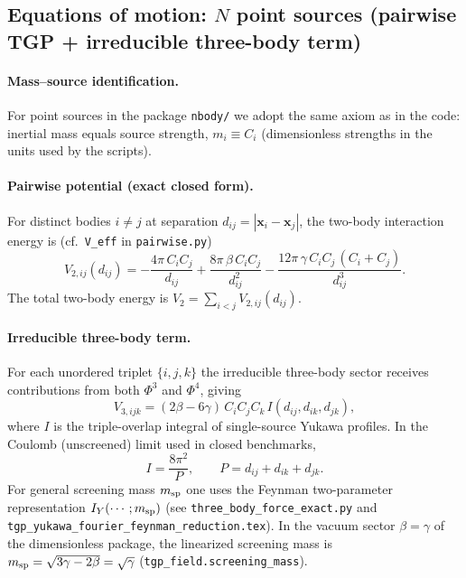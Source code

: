 
\subsection{Equations of motion: $N$ point sources (pairwise TGP + irreducible three-body term)}
\label{subsec:tgp-nbody-lagrangian-eom}

\paragraph{Mass--source identification.}
For point sources in the package \texttt{nbody/} we adopt the same axiom as in the code:
inertial mass equals source strength, $m_i \equiv C_i$ (dimensionless strengths in the units used by the scripts).

\paragraph{Pairwise potential (exact closed form).}
For distinct bodies $i\neq j$ at separation $d_{ij}=|\mathbf{x}_i-\mathbf{x}_j|$, the two-body interaction energy is (cf.\ \texttt{V\_eff} in \texttt{pairwise.py})
\begin{equation}
  V_{2,ij}(d_{ij})
  = -\frac{4\pi\,C_i C_j}{d_{ij}}
  + \frac{8\pi\,\beta\,C_i C_j}{d_{ij}^2}
  - \frac{12\pi\,\gamma\,C_i C_j\,(C_i+C_j)}{d_{ij}^3}.
\end{equation}
The total two-body energy is $V_2=\sum_{i<j}V_{2,ij}(d_{ij})$.

\paragraph{Irreducible three-body term.}
For each unordered triplet $\{i,j,k\}$ the irreducible three-body sector receives
contributions from both $\Phi^3$ and $\Phi^4$, giving
\begin{equation}
  V_{3,ijk}
  = (2\beta - 6\gamma)\,C_i C_j C_k\,
    I(d_{ij},d_{ik},d_{jk}),
  \label{eq:V3-I}
\end{equation}
where $I$ is the triple-overlap integral of single-source Yukawa profiles.  In the Coulomb (unscreened) limit used in closed benchmarks,
\begin{equation}
  I = \frac{8\pi^2}{P},
  \qquad
  P = d_{ij}+d_{ik}+d_{jk}.
\end{equation}
For general screening mass $m_{\rm sp}$ one uses the Feynman two-parameter representation $I_Y(\cdots;m_{\rm sp})$ (see \texttt{three\_body\_force\_exact.py} and \texttt{tgp\_yukawa\_fourier\_feynman\_reduction.tex}).  In the vacuum sector $\beta=\gamma$ of the dimensionless package, the linearized screening mass is $m_{\rm sp}=\sqrt{3\gamma-2\beta}=\sqrt{\gamma}$ (\texttt{tgp\_field.screening\_mass}).

